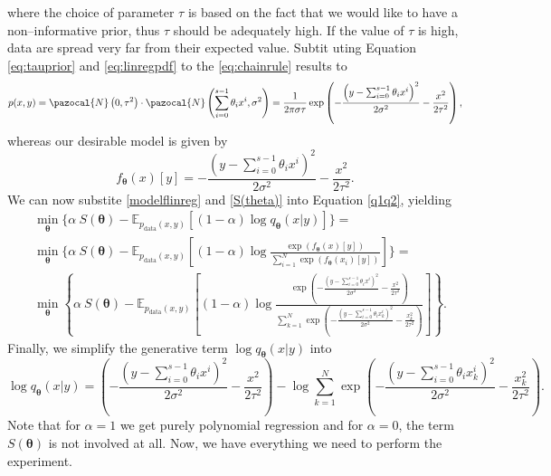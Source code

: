 where the choice of parameter $\tau$ is based on the fact that we would like to have a non--informative prior, thus $\tau$ should be adequately high. If the value of $\tau$ is high, data are spread very far from their expected value.  Subtit uting Equation \eqref{eq:tauprior} and \eqref{eq:linregpdf} to the \eqref{eq:chainrule} results to
\begin{equation}
	p(x,y) = \pazocal{N}\left(0,\tau^2\right) \cdot \pazocal{N}\left(\sum_{i=0}^{s-1} \theta_i x^i, \sigma^2 \right)  =  \frac{1}{2\pi\sigma\tau}\exp\left(-\frac{\left(y-\sum_{i=0}^{s-1} \theta_i x^i\right)^2}{2\sigma^2}-\frac{x^2}{2\tau^2}\right),
\end{equation}
whereas our desirable model is given by
\begin{equation}\label{modelflinreg}
	f_{\boldsymbol{\theta}}(x)[y] = -\frac{\left(y-\sum_{i=0}^{s-1} \theta_i x^i\right)^2}{2\sigma^2} - \frac{x^2}{2\tau^2}.
\end{equation}
We can now substite \eqref{modelflinreg} and \eqref{S(theta)} into Equation \eqref{q1q2}, yielding
\begin{align}\label{eq:SSEq}
	&\min_{\boldsymbol{\theta}}\Big\lbrace \alpha~S(\boldsymbol{\theta}) - \mathbb{E}_{p_{\mathrm{data}}(x,y)}\left[ \left(1-\alpha\right)\log q_{\boldsymbol{\theta}}\left(x|y\right) \right] \Big\rbrace  =\\
	&\min_{\boldsymbol{\theta}}\Bigg\lbrace \alpha~S(\boldsymbol{\theta}) - \mathbb{E}_{p_{\mathrm{data}}(x,y)}\left[ \left(1-\alpha\right)\log \frac{\exp\left({f_{\boldsymbol{\theta}}\left(x\right)[y]}\right)}{\sum_{i=1}^N\exp\left({f_{\boldsymbol{\theta}}\left(x_i\right)[y]}\right)} \right] \Bigg\rbrace  =\\
	&\min_{\boldsymbol{\theta}}\left\lbrace \alpha~S(\boldsymbol{\theta}) - \mathbb{E}_{p_{\mathrm{data}}(x,y)}\left[ \left(1-\alpha\right)\log \frac{\exp\left({-\frac{\left(y- \sum_{i=0}^{s-1} \theta_i x^i     \right)^2}{2\sigma^2} - \frac{x^2}{2\tau^2}}\right)}{\sum_{k=1}^N\exp\left({-\frac{\left(y-\sum_{i=0}^{s-1} \theta_i x_k^i\right)^2}{2\sigma^2} - \frac{x_k^2}{2\tau^2}}\right)} \right] \right\rbrace.  
\end{align}
Finally, we simplify the generative term $\log q_{\boldsymbol{\theta}}\left(x|y\right)$ into
\begin{equation}
	\log q_{\boldsymbol{\theta}}\left(x|y\right) =  \left(-\frac{\left(y-\sum_{i=0}^{s-1} \theta_i x^i\right)^2}{2\sigma^2} - \frac{x^2}{2\tau^2}\right) - \log \sum_{k=1}^N\exp\left({-\frac{\left(y-\sum_{i=0}^{s-1} \theta_i x_k^i\right)^2}{2\sigma^2} - \frac{x_k^2}{2\tau^2}}\right).
\end{equation}
Note that for $\alpha =1$ we get purely polynomial regression and for $\alpha =0$, the term $S(\boldsymbol{\theta})$ is not involved at all. Now, we have everything we need to perform the experiment.
